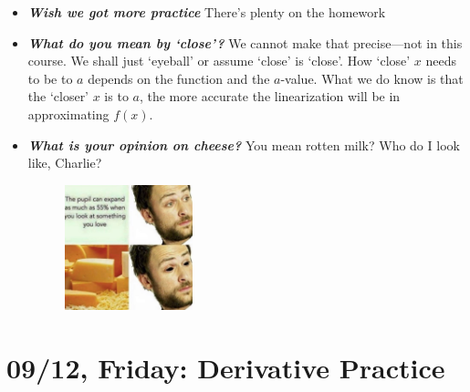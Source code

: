 \documentclass[11pt,letterpaper]{article}
\begin{document}
\begin{itemize}
\item {\bfseries\itshape Wish we got more practice} There's plenty on the homework \Winkey

\item {\bfseries\itshape What do you mean by `close'?} We cannot make that precise---not in this course. We shall just `eyeball' or assume `close' is `close'. How `close' $x$ needs to be to $a$ depends on the function and the $a$-value. What we do know is that the `closer' $x$ is to $a$, the more accurate the linearization will be in approximating $f(x)$.

\item {\bfseries\itshape What is your opinion on cheese?} You mean rotten milk? Who do I look like, Charlie?
	\begin{figure}[H]
	\centering
	\includegraphics[width=0.35\textwidth]{images/cheese.jpg}
	\end{figure}
\end{itemize}

\newpage
\section*{09/12, Friday: Derivative Practice\label{09-12}}
\end{document}
